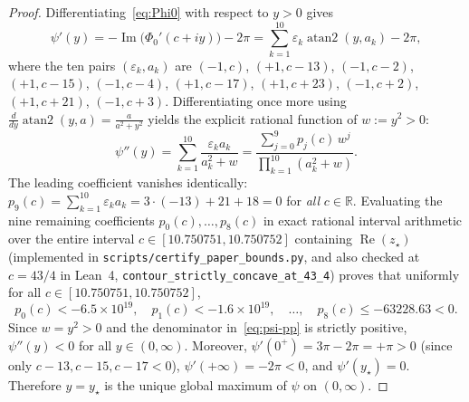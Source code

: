 \documentclass[11pt,reqno]{amsart}
\theoremstyle{definition}
\theoremstyle{remark}
\newcommand{\RR}{\mathbb{R}}
\begin{document}
\begin{proof}
Differentiating~\eqref{eq:Phi0} with respect to $y > 0$ gives
\[
  \psi'(y) = -\operatorname{Im}\bigl(\Phi_0'(c + iy)\bigr) - 2\pi
           = \sum_{k=1}^{10} \varepsilon_k \operatorname{atan2}(y, a_k) - 2\pi,
\]
where the ten pairs $(\varepsilon_k, a_k)$ are $(-1, c)$, $(+1, c-13)$, $(-1, c-2)$, $(+1, c-15)$, $(-1, c-4)$, $(+1, c-17)$, $(+1, c+23)$, $(-1, c+2)$, $(+1, c+21)$, $(-1, c+3)$. Differentiating once more using $\frac{d}{dy}\operatorname{atan2}(y, a) = \frac{a}{a^2 + y^2}$ yields the explicit rational function of $w := y^2 > 0$:
\begin{equation}
\label{eq:psi-pp}
  \psi''(y) = \sum_{k=1}^{10} \frac{\varepsilon_k a_k}{a_k^2 + w}
            = \frac{\sum_{j=0}^{9} p_j(c)\, w^j}{\prod_{k=1}^{10} (a_k^2 + w)}.
\end{equation}
The leading coefficient vanishes identically: $p_9(c) = \sum_{k=1}^{10} \varepsilon_k a_k = 3 \cdot (-13) + 21 + 18 = 0$ for \emph{all} $c \in \RR$. Evaluating the nine remaining coefficients $p_0(c), \ldots, p_8(c)$ in exact rational interval arithmetic over the entire interval $c \in [10.750751, 10.750752]$ containing $\operatorname{Re}(z_\star)$ (implemented in \texttt{scripts/certify\_paper\_bounds.py}, and also checked at $c = 43/4$ in Lean~4, \texttt{contour\_strictly\_concave\_at\_43\_4}) proves that uniformly for all $c \in [10.750751, 10.750752]$,
\[
  p_0(c) < -6.5\times 10^{19},\quad p_1(c) < -1.6\times 10^{19},\quad \ldots,\quad p_8(c) \le -63228.63 < 0.
\]
Since $w = y^2 > 0$ and the denominator in~\eqref{eq:psi-pp} is strictly positive, $\psi''(y) < 0$ for all $y \in (0, \infty)$. Moreover, $\psi'(0^+) = 3\pi - 2\pi = +\pi > 0$ (since only $c-13, c-15, c-17 < 0$), $\psi'(+\infty) = -2\pi < 0$, and $\psi'(y_\star) = 0$. Therefore $y = y_\star$ is the unique global maximum of $\psi$ on $(0, \infty)$.
\end{proof}
\end{document}
